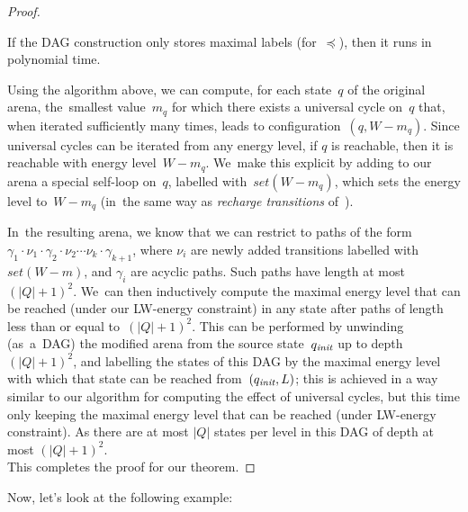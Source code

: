 \begin{proof}
    \vskip 0.5cm
    \begin{lemma}
    \label{lemma-DAG-construction-poly}
    If the DAG construction only stores maximal labels (for~$\preceq$), then it runs in polynomial time.
    \end{lemma}
    \vskip 0.3cm
    
    
    Using the algorithm above, we can compute, for each state~$q$ of the
    original arena, the~smallest value~$m_q$ for which there exists a
    universal cycle on~$q$ that, when iterated sufficiently many times,
    leads to configuration~$(q,W-m_q)$. Since universal cycles can be
    iterated from any energy level, if $q$ is reachable, then it is
    reachable with energy level~$W-m_q$. We~make this explicit by adding
    to our arena a special self-loop on~$q$, labelled with~$set(W-m_q)$,
    which sets the energy level to~$W-m_q$ (in~the same way as
    \emph{recharge transitions} of~\cite{EjsingDuun2013InfiniteRI}).
    
    In~the resulting arena, we know that we can restrict to paths of the
    form $\gamma_1\cdot \nu_1\cdot \gamma_2\cdot\nu_2\cdots
    \nu_k\cdot\gamma_{k+1}$, where $\nu_i$ are newly added transitions labelled with~$set(W-m)$, and $\gamma_i$ are acyclic paths. Such paths have length at most~$(|Q|+1)^2$. We~can then inductively compute the maximal energy level that can be reached (under our LW-energy constraint) in any state after paths of length less than or equal to~$(|Q|+1)^2$.  This can be performed by unwinding (as~a~DAG) the modified arena from the source state~$q_{\textit{init}}$ up to depth~$(|Q| +1)^2$, and labelling the states of this DAG by the maximal energy level with which that state can be reached from~$(q_{\textit{init}},L)$; this is achieved in a way similar to our algorithm for computing the effect of universal cycles, but this time only keeping the maximal energy level that can be reached (under LW-energy constraint). As there are at most $|Q|$ states per level in this DAG of depth at most $(|Q|+1)^2$.\\
    This completes the proof for our theorem.
    \end{proof}
    \vskip 0.1cm
    Now, let's look at the following example:
